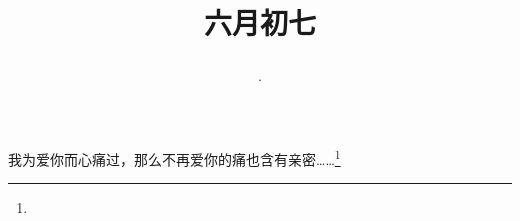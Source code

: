 \title{\date[d=12,m=7,y=2024][year:cn-y,年,month:cn,day:cn,日,·,weekday]·六月初七 }
我为爱你而心痛过，那么不再爱你的痛也含有亲密……\footnote{ }

